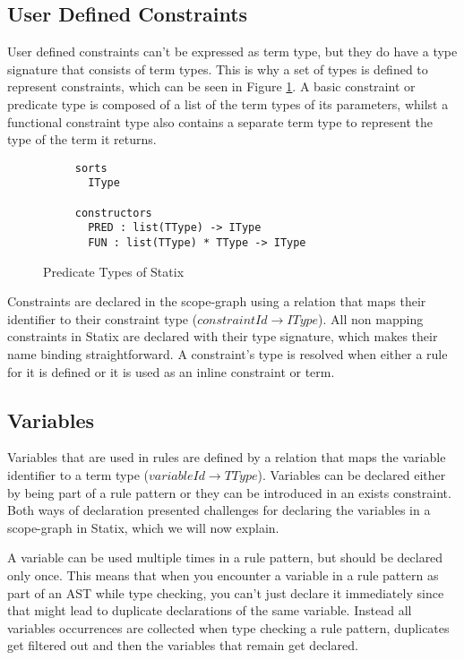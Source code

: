 \subsection{User Defined Constraints}

User defined constraints can't be expressed as term type, but they do have a type signature that consists of term types. This is why a set of types is defined to represent constraints, which can be seen in Figure \ref{fig:predicate-types}. A basic constraint or predicate type is composed of a list of the term types of its parameters, whilst a functional constraint type also contains a separate term type to represent the type of the term it returns.

\begin{figure}
  \begin{lstlisting}
     sorts
       IType

     constructors
       PRED : list(TType) -> IType
       FUN : list(TType) * TType -> IType
  \end{lstlisting}
  \caption{Predicate Types of Statix}
  \label{fig:predicate-types}
\end{figure}

Constraints are declared in the scope-graph using a relation that maps their identifier to their constraint type (\(constraintId \rightarrow IType\)). All non mapping constraints in Statix are declared with their type signature, which makes their name binding straightforward. A constraint's type is resolved when either a rule for it is defined or it is used as an inline constraint or term.

\subsection{Variables}

Variables that are used in rules are defined by a relation that maps the variable identifier to a term type (\(variableId \rightarrow TType\)). Variables can be declared either by being part of a rule pattern or they can be introduced in an exists constraint. Both ways of declaration presented challenges for declaring the variables in a scope-graph in Statix, which we will now explain.

A variable can be used multiple times in a rule pattern, but should be declared only once. This means that when you encounter a variable in a rule pattern as part of an AST while type checking, you can't just declare it immediately since that might lead to duplicate declarations of the same variable. Instead all variables occurrences are collected when type checking a rule pattern, duplicates get filtered out and then the variables that remain get declared.

